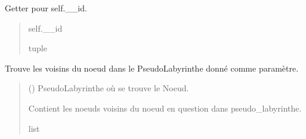 \documentclass[letterpaper,10pt,french]{sphinxmanual}
\begin{document}
\begin{fulllineitems}

\begin{fulllineitems}
\label{\detokenize{src:src.utilites.Noeud.get_id}}
\pysigstartsignatures
{}
\pysigstopsignatures
\sphinxAtStartPar
Getter pour self.\_\_id.
\begin{quote}\begin{description}
\sphinxAtStartPar
self.\_\_id

\sphinxAtStartPar
tuple

\end{description}\end{quote}

\end{fulllineitems}


\begin{fulllineitems}
\label{\detokenize{src:src.utilites.Noeud.get_voisins}}
\pysigstartsignatures
{}
\pysigstopsignatures
\sphinxAtStartPar
Trouve les voisins du noeud dans le PseudoLabyrinthe donné comme paramètre.
\begin{quote}\begin{description}
\sphinxAtStartPar
{} ({\hyperref[\detokenize{src:src.utilites.PseudoLabyrinthe}]{}}) \textendash{} PseudoLabyrinthe où se trouve le Noeud.

\sphinxAtStartPar
Contient les noeuds voisins du noeud en question dans pseudo\_labyrinthe.

\sphinxAtStartPar
list

\end{description}\end{quote}

\end{fulllineitems}


\end{fulllineitems}
\end{document}
